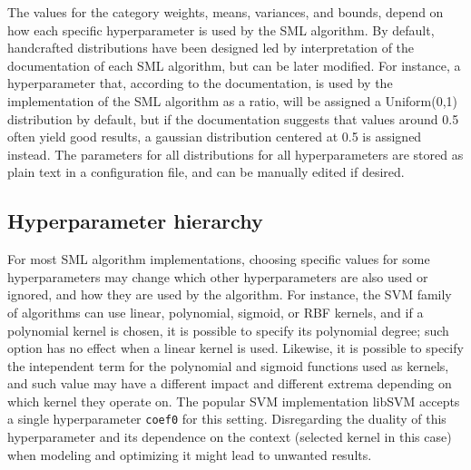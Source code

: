 	The values for the category weights, means, variances, and bounds, depend on how each specific
	hyperparameter is used by the SML algorithm. By default, handcrafted distributions have been designed
	led by interpretation of the documentation of each SML algorithm, but can be later modified. For
	instance, a hyperparameter that, according to the documentation, is used by the implementation
	of the SML algorithm as a ratio, will be assigned a Uniform(0,1) distribution by default, but if the
	documentation suggests that values around 0.5 often yield good results, a gaussian distribution
	centered at 0.5 is assigned instead. The parameters for all distributions for all
	hyperparameters are stored as plain text in a configuration file, and can be manually edited if
	desired.

	\subsection{Hyperparameter hierarchy}
	\label{ssec:hyp_hierarchy}
	For most SML algorithm implementations, choosing specific values for some hyperparameters may
	change which other hyperparameters are also used or ignored, and how they are used by the
	algorithm. For instance, the SVM family of algorithms can use linear,
	polynomial, sigmoid, or RBF kernels, and if a polynomial kernel is chosen, it is possible to
	specify its polynomial degree; such option has no effect when a linear kernel is used. Likewise,
	it is possible to specify the intependent term for the polynomial and sigmoid functions used as
	kernels, and such value may have a different impact and different extrema depending on which
	kernel they operate on. The popular SVM implementation libSVM accepts a single hyperparameter
	\texttt{coef0} for this setting. Disregarding the duality of this hyperparameter and its
	dependence on the context (selected kernel in this case) when modeling and optimizing it might
	lead to unwanted results.

